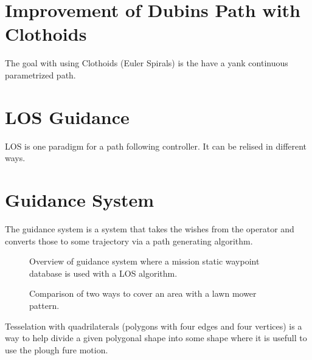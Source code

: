 
\section{Improvement of Dubins Path with Clothoids}
The goal with using Clothoids (Euler Spirals) is the have a yank
continuous parametrized path.

\section{\acs{LOS} Guidance}
\acl{LOS} is one paradigm for a path following controller. It can be relised in different ways.

\section{Guidance System}
The guidance system is a system that takes the wishes from the
operator and converts those to some trajectory via a path generating
algorithm.


\begin{figure}[htbp]
	\centering
	
	\caption{Overview of guidance system where a mission static waypoint
	database is used with a \ac{LOS} algorithm.}
\end{figure}


\begin{figure}[htbp]
	\centering
	
	\caption{Comparison of two ways to cover an area with a lawn mower
	pattern.}
    \label{fig:use-case-polygon}
\end{figure}


Tesselation with quadrilaterals (polygons with four edges and four vertices) is a way to help divide a given polygonal shape into some shape where it is usefull to use the plough fure motion.

